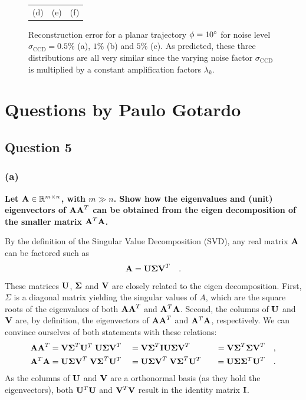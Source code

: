 \documentclass{report}
\begin{document}
\begin{figure}
\begin{tabular}{ccc}
  (d) &
  (e) &
  (f) 
  \end{tabular}
  \caption[Reconstruction error with $\phi = 10\degree$.]
   {Reconstruction error for a planar trajectory $\phi = 10\degree$ for noise level $\sigma_\text{CCD} = 0.5\%$ (a), $1\%$ (b) and $5\%$ (c). As predicted, these three distributions are all very similar since the varying noise factor $\sigma_\text{CCD}$ is multiplied by a constant amplification factors $\lambda_k$.}
  \label{q4:recons_err}
\end{figure}

\chapter{Questions by Paulo Gotardo}

\section{Question 5}
\subsection{(a)}
\textbf{Let $\mathbf{A} \in \mathbb{R}^{m \times n}$, with $m \gg n$. Show how the eigenvalues and (unit) eigenvectors of $\mathbf{AA}^T$ can be obtained from the eigen decomposition of the smaller matrix $\mathbf{A}^T\mathbf{A}$.}

By the definition of the Singular Value Decomposition (SVD), any real matrix $\mathbf{A}$ can be factored such as
\begin{equation}
\mathbf{A} = \mathbf{U \Sigma V}^T \quad.
\end{equation}
These matrices $\mathbf{U}$, $\mathbf{\Sigma}$ and $\mathbf{V}$ are closely related to the eigen decomposition. First, $\Sigma$ is a diagonal matrix yielding the singular values of $A$, which are the square roots of the eigenvalues of both $\mathbf{AA}^T$ and $\mathbf{A}^T\mathbf{A}$. Second, the columns of $\mathbf{U}$ and $\mathbf{V}$ are, by definition, the eigenvectors of $\mathbf{AA}^T$ and $\mathbf{A}^T\mathbf{A}$, respectively. We can convince ourselves of both statements with these relations:
\begin{align*}
\mathbf{AA}^T           &= \mathbf{V\Sigma}^T\mathbf{U}^T \; \mathbf{U\Sigma V}^T
                        &&= \mathbf{V\Sigma}^T\mathbf{IU\Sigma V}^T 
                        &&&= \mathbf{V\Sigma}^T\mathbf{\Sigma V}^T \quad,\\
\mathbf{A}^T\mathbf{A}  &= \mathbf{U\Sigma V}^T \; \mathbf{V\Sigma}^T\mathbf{U}^T
                        &&= \mathbf{U\Sigma V}^T \; \mathbf{V\Sigma}^T\mathbf{U}^T
                        &&&= \mathbf{U\Sigma}\mathbf{\Sigma}^T\mathbf{U}^T \quad.
\end{align*}
As the columns of $\mathbf{U}$ and $\mathbf{V}$ are a orthonormal basis (as they hold the eigenvectors), both $\mathbf{U}^T\mathbf{U}$ and $\mathbf{V}^T\mathbf{V}$ result in the identity matrix $\mathbf{I}$.
\end{document}
